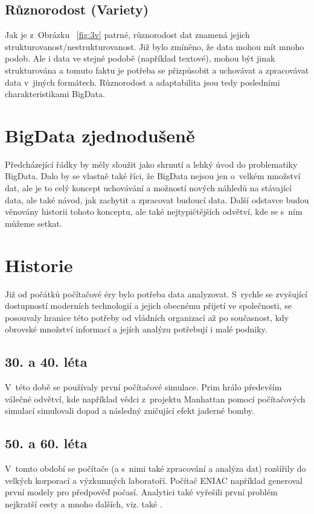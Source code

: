 \subsection{Různorodost (Variety)}
Jak je z~Obrázku ~\ref{fig:3v} patrné, různorodost dat znamená jejich strukturovanost/nestrukturovanost. Již bylo zmíněno, že data mohou mít mnoho podob. Ale i data ve stejné podobě (například textové), mohou být jinak strukturována a tomuto faktu je potřeba se přizpůsobit a uchovávat a zpracovávat data v~jiných formátech.
Různorodost a adaptabilita jsou tedy posledními charakteristikami BigData.

\section{BigData zjednodušeně}
Předcházející řádky by měly sloužit jako shrnutí a lehký úvod do problematiky BigData. Dalo by se vlastně také říci, že BigData nejsou jen o~velkém množství dat, ale je to celý koncept uchovávání a možností nových náhledů na stávající data, ale také návod, jak zachytit a zpracovat budoucí data. Další odstavce budou věnovány historii tohoto konceptu, ale také nejtypičtějších odvětví, kde se s~ním můžeme setkat. 

\section{Historie}

Již od počátků počítačové éry bylo potřeba data analyzovat. \cite{history} S~rychle se zvyšující dostupností moderních technologií a jejich obecnému přijetí ve společnosti, se posouvaly hranice této potřeby od vládních organizací až po současnost, kdy obrovské množství informací a jejích analýzu potřebují i malé podniky.

\subsection{30. a 40. léta}
V~této době se používaly první počítačové simulace. Prim hrálo především válečné odvětví, kde například vědci z~projektu Manhattan pomocí počítačových simulací simulovali dopad a následný zničující efekt jaderné bomby.

\subsection{50. a 60. léta}
V~tomto období se počítače (a s~nimi také zpracování a analýza dat) rozšířily do velkých korporací a výzkumných laboratoří. Počítač ENIAC například generoval první modely pro předpověď počasí. Analytici také vyřešili první problém nejkratší cesty a mnoho dalších, viz. také \cite{history}.

